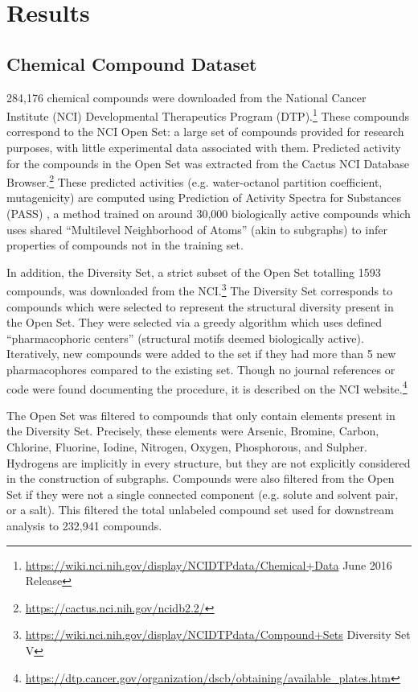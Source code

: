 \section{Results}

\subsection{Chemical Compound Dataset}
284,176 chemical compounds were downloaded from the National Cancer Institute (NCI) Developmental Therapeutics Program (DTP).\footnote{\url{https://wiki.nci.nih.gov/display/NCIDTPdata/Chemical+Data} June 2016 Release} These compounds correspond to the NCI Open Set: a large set of compounds provided for research purposes, with little experimental data associated with them. Predicted activity for the compounds in the Open Set was extracted from the Cactus NCI Database Browser.\footnote{\url{https://cactus.nci.nih.gov/ncidb2.2/}} These predicted activities (e.g. water-octanol partition coefficient, mutagenicity) are computed using Prediction of Activity Spectra for Substances (PASS) \citet{Lagunin2000}, a method trained on around 30,000 biologically active compounds which uses shared ``Multilevel Neighborhood of Atoms'' (akin to subgraphs) to infer properties of compounds not in the training set.

In addition, the Diversity Set, a strict subset of the Open Set totalling 1593 compounds, was downloaded from the NCI.\footnote{\url{https://wiki.nci.nih.gov/display/NCIDTPdata/Compound+Sets} Diversity Set V} The Diversity Set corresponds to compounds which were selected to represent the structural diversity present in the Open Set. They were selected via a greedy algorithm which uses defined ``pharmacophoric centers'' (structural motifs deemed biologically active). Iteratively, new compounds were added to the set if they had more than 5 new pharmacophores compared to the existing set. Though no journal references or code were found documenting the procedure, it is described on the NCI website.\footnote{\url{https://dtp.cancer.gov/organization/dscb/obtaining/available_plates.htm}}

The Open Set was filtered to compounds that only contain elements present in the Diversity Set. Precisely, these elements were Arsenic, Bromine, Carbon, Chlorine, Fluorine, Iodine, Nitrogen, Oxygen, Phosphorous, and Sulpher. Hydrogens are implicitly in every structure, but they are not explicitly considered in the construction of subgraphs. Compounds were also filtered from the Open Set if they were not a single connected component (e.g. solute and solvent pair, or a salt). This filtered the total unlabeled compound set used for downstream analysis to 232,941 compounds.

